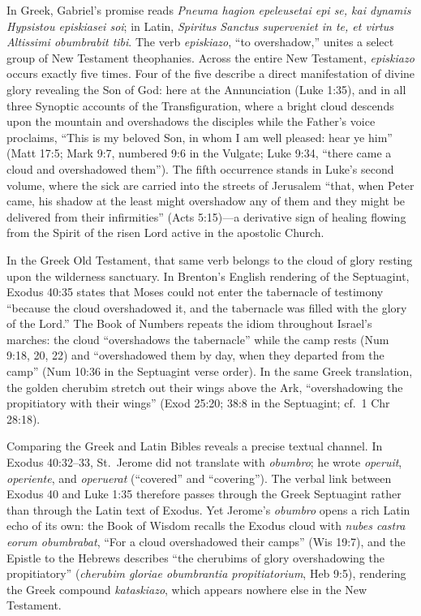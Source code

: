 In Greek, Gabriel's promise reads \textit{Pneuma hagion epeleusetai epi se, kai dynamis Hypsistou episkiasei soi}; in Latin, \textit{Spiritus Sanctus superveniet in te, et virtus Altissimi obumbrabit tibi}. The verb \textit{episkiazo}, ``to overshadow,'' unites a select group of New Testament theophanies. Across the entire New Testament, \textit{episkiazo} occurs exactly five times. Four of the five describe a direct manifestation of divine glory revealing the Son of God: here at the Annunciation (Luke 1:35), and in all three Synoptic accounts of the Transfiguration, where a bright cloud descends upon the mountain and overshadows the disciples while the Father's voice proclaims, ``This is my beloved Son, in whom I am well pleased: hear ye him'' (Matt 17:5; Mark 9:7, numbered 9:6 in the Vulgate; Luke 9:34, ``there came a cloud and overshadowed them''). The fifth occurrence stands in Luke's second volume, where the sick are carried into the streets of Jerusalem ``that, when Peter came, his shadow at the least might overshadow any of them and they might be delivered from their infirmities'' (Acts 5:15)---a derivative sign of healing flowing from the Spirit of the risen Lord active in the apostolic Church.

In the Greek Old Testament, that same verb belongs to the cloud of glory resting upon the wilderness sanctuary. In Brenton's English rendering of the Septuagint, Exodus 40:35 states that Moses could not enter the tabernacle of testimony ``because the cloud overshadowed it, and the tabernacle was filled with the glory of the Lord.'' The Book of Numbers repeats the idiom throughout Israel's marches: the cloud ``overshadows the tabernacle'' while the camp rests (Num 9:18, 20, 22) and ``overshadowed them by day, when they departed from the camp'' (Num 10:36 in the Septuagint verse order). In the same Greek translation, the golden cherubim stretch out their wings above the Ark, ``overshadowing the propitiatory with their wings'' (Exod 25:20; 38:8 in the Septuagint; cf.\ 1 Chr 28:18).

Comparing the Greek and Latin Bibles reveals a precise textual channel. In Exodus 40:32--33, St.\ Jerome did not translate with \textit{obumbro}; he wrote \textit{operuit}, \textit{operiente}, and \textit{operuerat} (``covered'' and ``covering''). The verbal link between Exodus 40 and Luke 1:35 therefore passes through the Greek Septuagint rather than through the Latin text of Exodus. Yet Jerome's \textit{obumbro} opens a rich Latin echo of its own: the Book of Wisdom recalls the Exodus cloud with \textit{nubes castra eorum obumbrabat}, ``For a cloud overshadowed their camps'' (Wis 19:7), and the Epistle to the Hebrews describes ``the cherubims of glory overshadowing the propitiatory'' (\textit{cherubim gloriae obumbrantia propitiatorium}, Heb 9:5), rendering the Greek compound \textit{kataskiazo}, which appears nowhere else in the New Testament.


